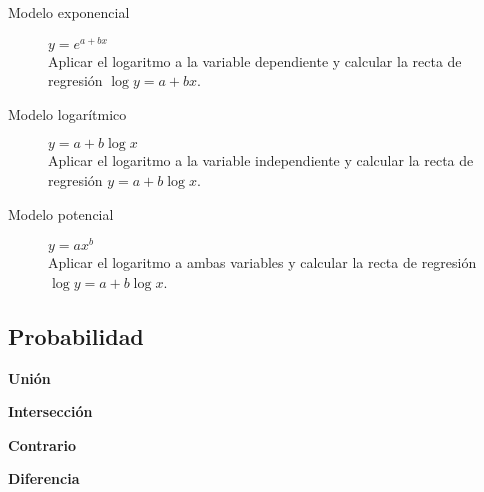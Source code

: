 \begin{multicols*}{2}
\begin{tcolorbox}[hbox, title=Regresión no lineal]
\begin{minipage}{0.4\textwidth}
\begin{description}
\item[Modelo exponencial] $y=e^{a+bx}$\\
      Aplicar el logaritmo a la variable dependiente y calcular la recta de regresión $\log y = a+bx$.
\item[Modelo logarítmico] $y=a+b\log x$\\
      Aplicar el logaritmo a la variable independiente y calcular la recta de regresión $y=a+b\log x$.
\item[Modelo potencial] $y=ax^b$\\
      Aplicar el logaritmo a ambas variables y calcular la recta de regresión $\log y = a+b\log x$.
\end{description}
\end{minipage}
\end{tcolorbox}

\newpage

\subsection*{Probabilidad}

\begin{tcolorbox}[hbox, title=Operaciones de sucesos]
\begin{minipage}{0.4\textwidth}
\textbf{Unión}
\begin{center}

\end{center}
\textbf{Intersección}
\begin{center}

\end{center}
\textbf{Contrario}
\begin{center}

\end{center}
\textbf{Diferencia}
\begin{center}

\end{center}
\end{minipage}
\end{tcolorbox}


\end{multicols*}

